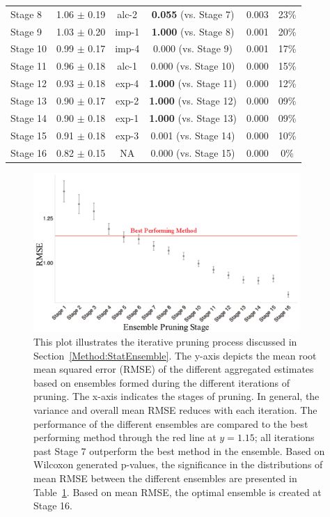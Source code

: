 \documentclass[12pt]{article}
\newcommand{\+}[1]{\ensuremath{\mathbf{#1}}}
\begin{document}
\begin{table}[t!]
\begin{tabular}{l|c|c|c|c|c}
		Stage 8 & 1.06 $\pm$ 0.19 & alc-2 & \textbf{0.055}  (vs. Stage 7) & 0.003 & 23\%\\
		Stage 9 & 1.03 $\pm$ 0.20 & imp-1 & \textbf{1.000}  (vs. Stage 8)& 0.001 & 20\%\\
		Stage 10 & 0.99 $\pm$ 0.17 & imp-4 & 0.000  (vs. Stage 9)& 0.001 & 17\%\\
		Stage 11 & 0.96 $\pm$ 0.18 & alc-1 & 0.000  (vs. Stage 10) & 0.000 & 15\%\\														
		Stage 12 & 0.93 $\pm$ 0.18 & exp-4 &  \textbf{1.000}  (vs. Stage 11)& 0.000 & 12\%\\
		Stage 13 & 0.90 $\pm$ 0.17 & exp-2 & \textbf{1.000}  (vs. Stage 12) &0.000 &  09\%\\															
		Stage 14 & 0.90 $\pm$ 0.18 & exp-1 & \textbf{1.000}   (vs. Stage 13)& 0.000 & 09\%\\															
		Stage 15 & 0.91 $\pm$ 0.18 & exp-3 &   0.001 (vs. Stage 14)&  0.000  & 10\%\\																
		Stage 16 & 0.82 $\pm$ 0.15 & NA  & 0.000   (vs. Stage 15)&0.000 &  0\%\\
		\hline
		\hline
	\end{tabular}
	\label{Analysis:Table2:BMA}
\end{table}



\begin{figure}[h!]
	\centering
	\includegraphics[keepaspectratio,width=0.9\textwidth]{Figures/BMA_Mean_RMSE_Per_Stage_Scatterplot}
	\caption{This plot illustrates the iterative pruning process discussed in Section~\ref{Method:StatEnsemble}. The y-axis depicts the mean root mean squared error (RMSE) of the different aggregated estimates based on ensembles formed during the different iterations of pruning. The x-axis indicates the stages of pruning. In general, the variance and overall mean RMSE reduces with each iteration. The performance of the different ensembles are compared to the best performing method through the red line at $y=1.15$; all iterations past Stage 7 outperform the best method in the ensemble. Based on Wilcoxon generated p-values, the significance in the distributions of mean RMSE between the different ensembles are presented in Table~\ref{Analysis:Table2:BMA}. Based on mean RMSE, the optimal ensemble is created at Stage 16.}
	\label{Analysis:Figure2:BMA}
\end{figure}
\end{document}
